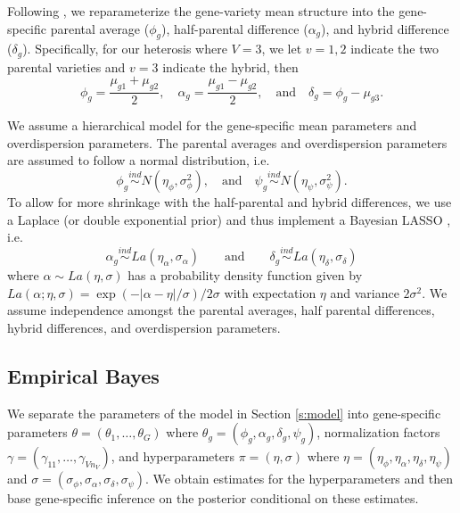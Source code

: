 \documentclass[useAMS,usenatbib,referee]{biom}
\begin{document}
Following \cite{ji2014estimation}, we reparameterize the gene-variety mean structure into the gene-specific parental average ($\phi_g$), half-parental difference ($\alpha_g$), and hybrid difference ($\delta_g$). Specifically, for our heterosis where $V=3$, we let $v=1,2$ indicate the two parental varieties and $v=3$ indicate the hybrid, then
\[ \phi_g = \frac{\mu_{g1}+\mu_{g2}}{2}, \quad 
\alpha_g = \frac{\mu_{g1}-\mu_{g2}}{2}, \quad \mbox{and} \quad
\delta_g = \phi_g-\mu_{g3}. \]

We assume a hierarchical model for the gene-specific mean parameters and overdispersion parameters. The parental averages and overdispersion parameters are assumed to follow a normal distribution, i.e.
\[ 
\phi_g \stackrel{ind}{\sim} N(\eta_\phi, \sigma_\phi^2), \quad \mbox{and}\quad 
\psi_g \stackrel{ind}{\sim} N(\eta_\psi,\sigma_\psi^2). 
\]
To allow for more shrinkage with the half-parental and hybrid differences, we use a Laplace (or double exponential prior) and thus implement a Bayesian LASSO \citep{park2008bayesian}, i.e. 
\[ 
\alpha_g \stackrel{ind}{\sim} La(\eta_\alpha, \sigma_\alpha) \qquad \mbox{and} \qquad
\delta_g \stackrel{ind}{\sim} La(\eta_\delta, \sigma_\delta) 
\]
where $\alpha\sim La(\eta,\sigma)$ has a probability density function given by $La(\alpha;\eta,\sigma) = \exp(-|\alpha-\eta|/\sigma)/2\sigma$ with expectation $\eta$ and variance $2\sigma^2$. We assume independence amongst the parental averages, half parental differences, hybrid differences, and overdispersion parameters.


\subsection{Empirical Bayes}
\label{s:ebayes}

We separate the parameters of the model in Section \ref{s:model} into gene-specific parameters $\theta = (\theta_1,\ldots,\theta_G)$ where $\theta_g = (\phi_g,\alpha_g,\delta_g,\psi_g)$, normalization factors $\gamma = (\gamma_{11},\ldots,\gamma_{Vn_V})$, and hyperparameters $\pi = (\eta, \sigma)$ where $\eta=(\eta_\phi,\eta_\alpha,\eta_\delta, \eta_\psi)$ and $\sigma=(\sigma_\phi,\sigma_\alpha,\sigma_\delta,\sigma_\psi)$. We obtain estimates for the hyperparameters and then base gene-specific inference on the posterior conditional on these estimates. 
\end{document}
